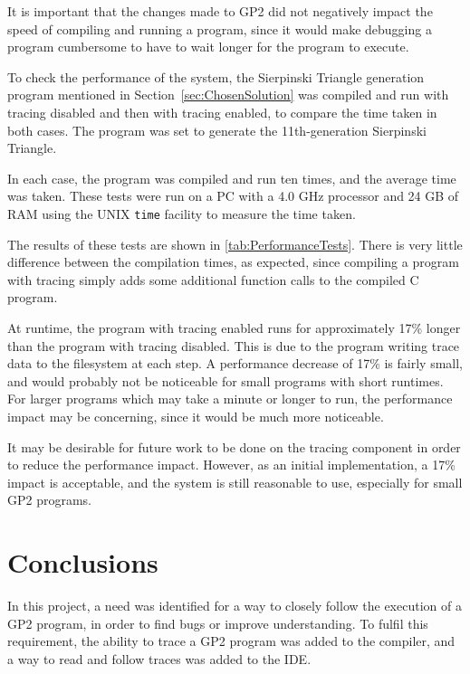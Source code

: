 \documentclass[authoryearcitations]{UoYCSproject}
\begin{document}
It is important that the changes made to GP2 did not negatively impact the speed
of compiling and running a program, since it would make debugging a program
cumbersome to have to wait longer for the program to execute.

To check the performance of the system, the Sierpinski Triangle generation
program mentioned in Section~\ref{sec:ChosenSolution} was compiled and run with
tracing disabled and then with tracing enabled, to compare the time taken in
both cases. The program was set to generate the 11th-generation Sierpinski
Triangle.

In each case, the program was compiled and run ten times, and the average time
was taken. These tests were run on a PC with a 4.0 GHz processor and 24 GB of RAM
using the UNIX \texttt{time} facility to measure the time taken.

The results of these tests are shown in \autoref{tab:PerformanceTests}. There
is very little difference between the compilation times, as expected, since compiling
a program with tracing simply adds some additional function calls to the compiled
C program.

At runtime, the program with tracing enabled runs for approximately 17\% longer
than the program with tracing disabled. This is due to the program writing trace
data to the filesystem at each step. A performance decrease of 17\% is fairly small,
and would probably not be noticeable for small programs with short runtimes. For
larger programs which may take a minute or longer to run, the performance impact
may be concerning, since it would be much more noticeable.

It may be desirable for future work to be done on the tracing component in order
to reduce the performance impact. However, as an initial implementation, a 17\%
impact is acceptable, and the system is still reasonable to use, especially for
small GP2 programs.

\clearpage


\chapter{Conclusions}
\label{cha:Conclusions}

In this project, a need was identified for a way to closely follow the execution
of a GP2 program, in order to find bugs or improve understanding. To fulfil this
requirement, the ability to trace a GP2 program was added to the compiler, and
a way to read and follow traces was added to the IDE.
\end{document}

